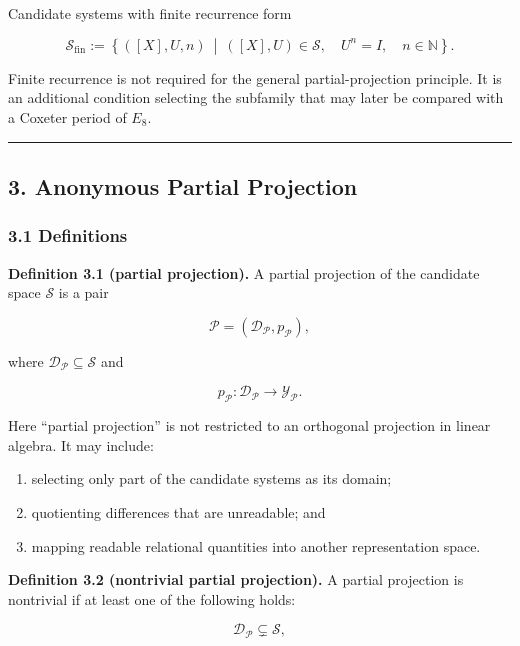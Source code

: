 \documentclass[
  a4paper,
]{article}
\providecommand{\tightlist}{%
  \setlength{\itemsep}{0pt}\setlength{\parskip}{0pt}}
\begin{document}
Candidate systems with finite recurrence form

\[
\mathscr S_{\mathrm{fin}}
:=
\left\{
([X],U,n)
\ \middle|\
([X],U)\in\mathscr S,\quad
U^n=I,\quad
n\in\mathbb N
\right\}.
\]

Finite recurrence is not required for the general partial-projection
principle. It is an additional condition selecting the subfamily that
may later be compared with a Coxeter period of \(E_8\).

\begin{center}\rule{0.5\linewidth}{0.5pt}\end{center}

\subsection{3. Anonymous Partial
Projection}\label{anonymous-partial-projection}

\subsubsection{3.1 Definitions}\label{definitions}

\textbf{Definition 3.1 (partial projection).} A partial projection of
the candidate space \(\mathscr S\) is a pair

\[
\mathcal P
=
\left(
\mathscr D_{\mathcal P},
p_{\mathcal P}
\right),
\]

where \(\mathscr D_{\mathcal P}\subseteq\mathscr S\) and

\[
p_{\mathcal P}:
\mathscr D_{\mathcal P}
\longrightarrow
\mathscr Y_{\mathcal P}.
\]

Here ``partial projection'' is not restricted to an orthogonal
projection in linear algebra. It may include:

\begin{enumerate}
\def\labelenumi{\arabic{enumi}.}
\tightlist
\item
  selecting only part of the candidate systems as its domain;
\item
  quotienting differences that are unreadable; and
\item
  mapping readable relational quantities into another representation
  space.
\end{enumerate}

\textbf{Definition 3.2 (nontrivial partial projection).} A partial
projection is nontrivial if at least one of the following holds:

\[
\mathscr D_{\mathcal P}
\subsetneq
\mathscr S,
\]
\end{document}
